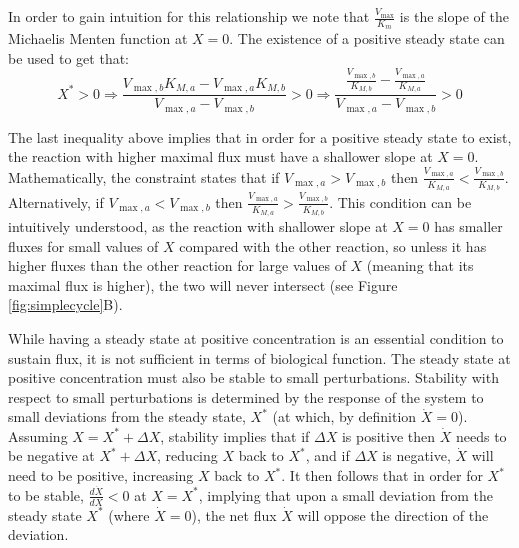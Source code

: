     In order to gain intuition for this relationship we note that $\frac{V_{\max}}{K_m}$ is the slope of the Michaelis Menten function at $X=0$.
    The existence of a positive steady state can be used to get that:
    \begin{equation*}
      X^*>0 \Rightarrow \frac{V_{\max,b}K_{M,a}-V_{\max,a}K_{M,b}}{V_{\max,a}-V_{\max,b}}>0 \Rightarrow \frac{\frac{V_{\max,b}}{K_{M,b}}-\frac{V_{\max,a}}{K_{M,a}}}{V_{\max,a}-V_{\max,b}}>0
    \end{equation*}

    The last inequality above implies that in order for a positive steady state to exist, the reaction with higher maximal flux must have a shallower slope at $X=0$.
    Mathematically, the constraint states that if $V_{\max,a}>V_{\max,b}$ then $\frac{V_{\max,a}}{K_{M,a}}<\frac{V_{\max,b}}{K_{M,b}}$.
    Alternatively, if $V_{\max,a}<V_{\max,b}$ then $\frac{V_{\max,a}}{K_{M,a}}>\frac{V_{\max,b}}{K_{M,b}}$.
    This condition can be intuitively understood, as the reaction with shallower slope at $X=0$ has smaller fluxes for small values of $X$ compared with the other reaction, so unless it has higher fluxes than the other reaction for large values of $X$ (meaning that its maximal flux is higher), the two will never intersect (see Figure \ref{fig:simplecycle}B).

    While having a steady state at positive concentration is an essential condition to sustain flux, it is not sufficient in terms of biological function.
    The steady state at positive concentration must also be stable to small perturbations.
    Stability with respect to small perturbations is determined by the response of the system to small deviations from the steady state, $X^*$ (at which, by definition $\dot X=0$).
    Assuming $X = X^*+\Delta X$, stability implies that if $\Delta X$ is positive then $\dot X$ needs to be negative at $X^*+\Delta X$, reducing $X$ back to $X^*$, and if $\Delta X$ is negative, $\dot X$ will need to be positive, increasing $X$ back to $X^*$.
    It then follows that in order for $X^*$ to be stable, $\frac{d\dot X}{dX} <0$ at $X=X^*$, implying that upon a small deviation from the steady state $X^*$ (where $\dot X=0$), the net flux $\dot X$ will oppose the direction of the deviation.

